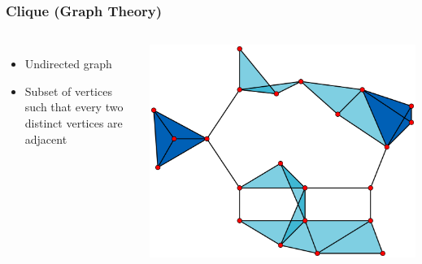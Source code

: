 \begin{frame}
\frametitle{Clique (Graph Theory)}
\begin{columns}

\begin{itemize}
    \item Undirected graph
    \item Subset of vertices such that every two distinct vertices are adjacent
\end{itemize}

\includegraphics[width=1\linewidth]{img/clique}


\end{columns}
\end{frame}
